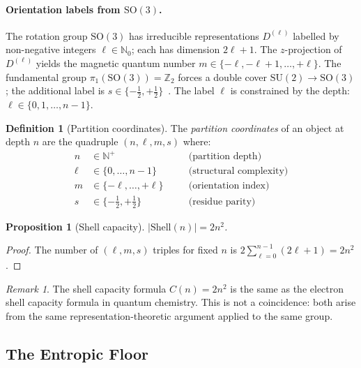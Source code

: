 \documentclass[twocolumn,11pt,a4paper]{article}
\newtheorem{proposition}[theorem]{Proposition}
\theoremstyle{definition}
\newtheorem{definition}[theorem]{Definition}
\theoremstyle{remark}
\newtheorem{remark}[theorem]{Remark}
\begin{document}
\paragraph{Orientation labels from $\mathrm{SO}(3)$.}
The rotation group $\mathrm{SO}(3)$ has irreducible representations
$D^{(\ell)}$ labelled by non-negative integers $\ell \in \mathbb{N}_0$;
each has dimension $2\ell + 1$.  The $z$-projection of
$D^{(\ell)}$ yields the magnetic quantum number $m \in
\{-\ell, -\ell+1, \ldots, +\ell\}$.  The fundamental group
$\pi_1(\mathrm{SO}(3)) = \mathbb{Z}_2$ forces a double cover
$\mathrm{SU}(2) \to \mathrm{SO}(3)$; the additional label is $s \in
\{-\tfrac{1}{2}, +\tfrac{1}{2}\}$~\cite{hall2015lie}.  The label
$\ell$ is constrained by the depth: $\ell \in \{0, 1, \ldots, n-1\}$.

\begin{definition}[Partition coordinates]
\label{def:partcoord}
The \emph{partition coordinates} of an object at depth $n$ are the
quadruple $(n, \ell, m, s)$ where:
\begin{align*}
n &\in \mathbb{N}^+ &\quad& \text{(partition depth)}\\
\ell &\in \{0,\ldots,n-1\} && \text{(structural complexity)}\\
m &\in \{-\ell,\ldots,+\ell\} && \text{(orientation index)}\\
s &\in \{-\tfrac{1}{2},+\tfrac{1}{2}\} && \text{(residue parity)}
\end{align*}
\end{definition}

\begin{proposition}[Shell capacity]
\label{prop:shell}
$|\mathrm{Shell}(n)| = 2n^2$.
\end{proposition}
\begin{proof}
The number of $(\ell, m, s)$ triples for fixed $n$ is
$2 \sum_{\ell=0}^{n-1}(2\ell+1) = 2n^2$.
\end{proof}

\begin{remark}
The shell capacity formula $C(n) = 2n^2$ is the same as the electron
shell capacity formula in quantum chemistry.  This is not a coincidence:
both arise from the same representation-theoretic argument applied to
the same group.
\end{remark}



\subsection{The Entropic Floor}
\label{sec:floor}
\end{document}

